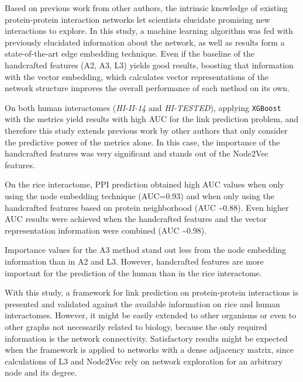 Based on previous work from other authors\cite{Kovacs2019}, the intrinsic
knowledge of existing protein-protein interaction networks let scientists
elucidate promising new interactions to explore. In this study, a
machine learning algorithm was fed with previously elucidated information
about the network, as well as results form a state-of-the-art edge
embedding technique. Even if the baseline of the handcrafted features
(A2, A3, L3) yields good results, boosting that information with the
vector embedding, which calculates vector representations of the network
structure improves the overall performance of each method on its own.

On both human interactomes (\emph{HI-II-14} and \emph{HI-TESTED}),
applying \texttt{XGBoost} with the metrics yield results with high
AUC for the link prediction problem, and therefore this study extends
previous work by other authors that only consider the predictive power
of the metrics alone. In this case, the importance of the handcrafted
features was very significant and stands out of the Node2Vec features.

On the rice interactome, PPI prediction obtained high AUC values when
only using the node embedding technique (AUC=0.93) and when only using
the handcrafted features based on protein neighborhood (AUC \textasciitilde 0.88).
Even higher AUC results were achieved when the handcrafted features
and the vector representation information were combined (AUC \textasciitilde 0.98).

Importance values for the A3 method stand out less from the node embedding
information than in A2 and L3. However, handcrafted features are more
important for the prediction of the human than in the rice interactome. 

With this study, a framework for link prediction on protein-protein
interactions is presented and validated against the available information
on rice and human interactomes. However, it might be easily extended
to other organisms or even to other graphs not necessarily related
to biology, because the only required information is the network connectivity.
Satisfactory results might be expected when the framework is applied
to networks with a dense adjacency matrix, since calculations of L3
and Node2Vec rely on network exploration for an arbitrary node and
its degree.
